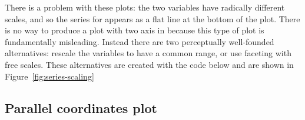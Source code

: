 There is a problem with these plots: the two variables have radically different scales, and so the series for  appears as a flat line at the bottom of the plot. There is no way to produce a plot with two axis in \ggplot because this type of plot is fundamentally misleading. Instead there are two perceptually well-founded alternatives: rescale the variables to have a common range, or use faceting with free scales. These alternatives are created with the code below and are shown in Figure~\ref{fig:series-scaling}

% 


\subsection{Parallel coordinates plot} 
\label{sub:molten_data}


